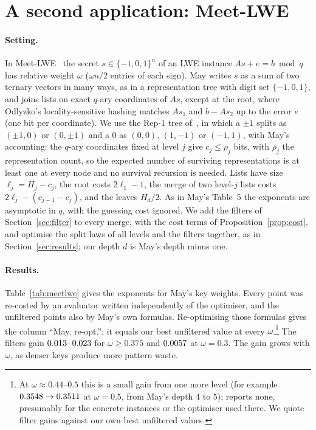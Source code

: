\section{A second application: Meet-LWE}\label{sec:meetlwe}
\paragraph{Setting.} In Meet-LWE~\cite{May21} the secret $s\in\{-1,0,1\}^n$ of an LWE instance $As+e=b\bmod q$ has
relative weight $\omega$ ($\omega n/2$ entries of each sign). May writes $s$ as a sum of two ternary vectors in many
ways, as in a representation tree with digit set $\{-1,0,1\}$, and joins lists on exact $q$-ary coordinates of $As$,
except at the root, where Odlyzko's locality-sensitive hashing matches $As_1$ and $b-As_2$ up to the error $e$ (one
bit per coordinate). We use the Rep-1 tree of~\cite[\S7]{May21}, in which a $\pm1$ splits as $(\pm1,0)$ or
$(0,\pm1)$ and a $0$ as $(0,0)$, $(1,-1)$ or $(-1,1)$, with May's accounting: the $q$-ary coordinates fixed at level
$j$ give $c_j\le\rho_j$ bits, with $\rho_j$ the representation count, so the expected number of surviving
representations is at least one at every node and no survival recursion is needed. Lists have size $\ell_j=H_j-c_j$,
the root costs $2\ell_1-1$, the merge of two level-$j$ lists costs $2\ell_j-(c_{j-1}-c_j)$, and the leaves $H_d/2$. As
in May's Table~5 the exponents are asymptotic in $q$, with the guessing cost ignored. We add the filters of
Section~\ref{sec:filter} to every merge, with the cost terms of Proposition~\ref{prop:cost}, and optimise the split
laws of all levels and the filters together, as in Section~\ref{sec:results}; our depth $d$ is May's depth minus one.

\paragraph{Results.} Table~\ref{tab:meetlwe} gives the exponents for May's key weights. Every point was re-costed by an
evaluator written independently of the optimiser, and the unfiltered points also by May's own formulas.
Re-optimising those formulas gives the column ``May, re-opt.''; it equals our best unfiltered value at every
$\omega$.\footnote{At $\omega\approx0.44$--$0.5$ this is a small gain from one more level (for example
$0.3548\to0.3511$ at $\omega=0.5$, from May's depth $4$ to $5$); \cite[\S7]{May21} reports none, presumably for the
concrete instances or the optimiser used there. We quote filter gains against our own best unfiltered values.} The
filters gain $0.013$--$0.023$ for $\omega\ge0.375$ and $0.0057$ at $\omega=0.3$. The gain grows with $\omega$,
as denser keys produce more pattern waste.

